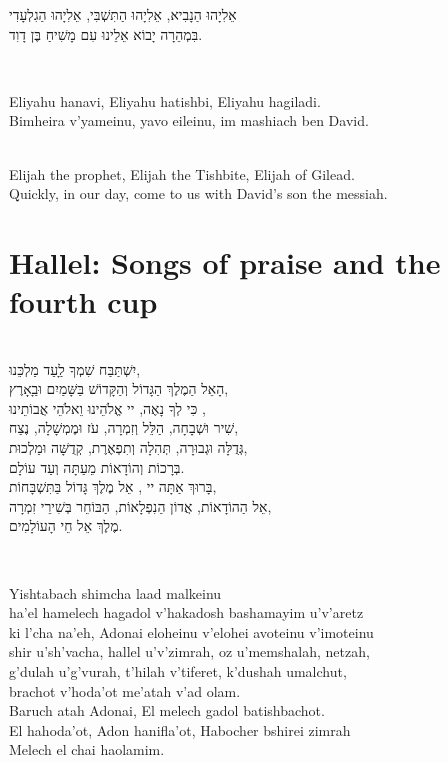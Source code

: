 \documentclass[extrafontsizes,twoside,17pt,a4paper,openany]{memoir}
\newcommand{\HgInst}[1]{{\noindent\sffamily{\bfseries{#1}}}}
\newcommand{\ch}{ch}
\newenvironment{HgHebrew}{\begin{hebrew}\noindent\large}{\end{hebrew}}
\newenvironment{HgHebrewl}{\begin{hebrew}\strut\\\noindent}{\end{hebrew}}
\newenvironment{HgEnglish}{\strut\\\noindent}{\vspace{1em}}
\newenvironment{HgTranslit}{\strut\\\noindent\begin{itshape}}{\end{itshape}\vspace{1em}}
\begin{document}
\begin{HgHebrew}
  אֵלִיָהוּ הַנָבִיא, אֵלִיָהוּ הַתִּשְׁבִּי, אֵלִיָהוּ הַגִלְעָדִי 
  \\
  בִּמְהֵרָה יָבוֹא אֵלֵינוּ עִם מָשִׁיחַ בֶּן דָוִד.
\end{HgHebrew}

\begin{HgTranslit}
  Eliyahu hanavi, Eliyahu hatishbi, Eliyahu hagiladi. \\
  Bimheira v'yameinu, yavo eileinu, im mashiach ben David.
\end{HgTranslit}
\vspace{-1em}

\begin{HgEnglish}
  Elijah the prophet, Elijah the Tishbite, Elijah of Gilead. \\
  Quickly, in our day, come to us with David's son the messiah.
\end{HgEnglish}

\vfill

\chapter{Hallel: Songs of praise and the fourth cup}

\HgInst{Recite:}

\begin{HgHebrewl}
  יִשְׁתַּבַּח שִׁמְךָ לַָעַד מַלְכֵּנוּ,  \\
  הָאֵל הַמֶלֶךְ הַגָּדוֹל וְהַקָּדוֹשׁ בַּשָּׁמַיִם וּבַָאָרֶץ, \\
  כִּי לְךָ נָאֶה, יי אֱלֹהֵינוּ וֵאלֹהֵי אֲבוֹתֵינוּ ,  \\
  שִׁיר וּשְׁבָחָה, הַלֵּל וְזִמְרָה, עֹז וּמֶמְשָׁלָה, נֶצַח,  \\
  גְּדֻלָּה וּגְבוּרָה, תְּהִלָה וְתִפְאֶרֶת, קְדֻשָּׁה וּמַלְכוּת, \\
  בְּרָכוֹת וְהוֹדָאוֹת מֵעַתָּה וְעַד עוֹלָם.  \\
  בָּרוּךְ אַתָּה יי , אֵל מֶלֶךְ גָּדוֹל בַּתִּשְׁבָּחוֹת,  \\
  אֵל הַהוֹדָאוֹת, אֲדוֹן הַנִפְלָאוֹת, הַבּוֹחֵר בְּשִׁירֵי זִמְרָה,  \\
  מֶלֶךְ אֵל חֵי הָעוֹלָמִים. 
\end{HgHebrewl}

\begin{HgTranslit}\raggedright
  Yishtaba{\ch} shim{\ch}a laad malkeinu \\
  ha'el hamele{\ch} hagadol v'hakadosh bashamayim u'v'aretz \\
  ki l'{\ch}a na'eh, Adonai eloheinu v'elohei avoteinu v'imoteinu\\
  shir u'sh'va{\ch}a, hallel u'v'zimrah, oz u'memshalah, netzah, \\
  g'dulah u'g'vurah, t'hilah v'tiferet, k'dushah umal{\ch}ut, \\
  bra{\ch}ot v'hoda'ot me'atah v'ad olam. \\
  Baru{\ch} atah Adonai, El mele{\ch} gadol batishba{\ch}ot. \\
  El hahoda'ot, Adon hanifla'ot, Habo{\ch}er bshirei zimrah \\
  Mele{\ch} el {\ch}ai haolamim.
\end{HgTranslit}
\end{document}
